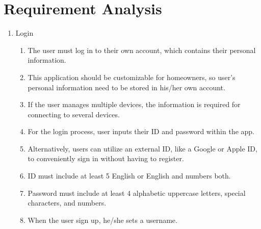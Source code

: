 \section{\Large{Requirement Analysis}}
\begin{enumerate}[label=\arabic*.]
    \item {\large{Login}}\\

    \begin{enumerate}[label*={\arabic*.},ref=\theenumi.\arabic*]
    \setlength{\itemindent}{0.5cm}
        \item The user must log in to their own account, which contains their personal information.\\
        
        \item This application should be customizable for homeowners, so user’s personal information need to be stored in his/her own account.\\
        
        \item If the user manages multiple devices, the information is required for connecting to several devices.\\
        
        
        \item For the login process, user inputs their ID and password within the app.\\
        
        \item Alternatively, users can utilize an external ID, like a Google or Apple ID, to conveniently sign in without having to register.\\
    
        \item ID must include at least 5 English or English and numbers both.\\
    
        \item Password must include at least 4 alphabetic uppercase letters, special characters, and numbers.\\

        \item When the user sign up, he/she sets a username.\\


\end{enumerate}
\end{enumerate}
